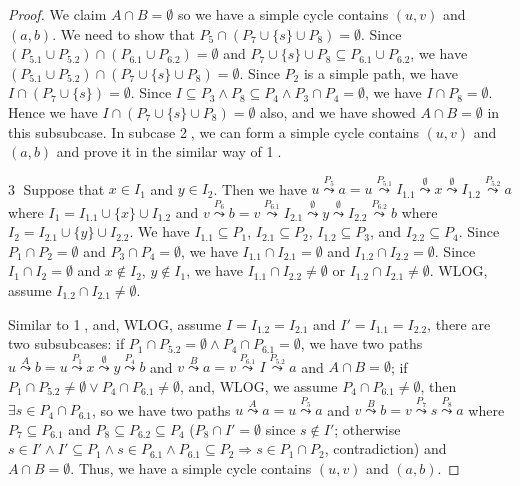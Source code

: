 \begin{proof}
    We claim $A \cap B = \emptyset$ so we have a simple cycle contains $(u,v)$ and $(a,b)$.
    We need to show that $P_5 \cap (P_7 \cup \{ s \} \cup P_8) = \emptyset$.
    Since $(P_{5.1} \cup P_{5.2}) \cap (P_{6.1} \cup P_{6.2}) = \emptyset$
    and $P_7 \cup \{ s \} \cup P_8 \subseteq P_{6.1} \cup P_{6.2}$,
    we have $(P_{5.1} \cup P_{5.2}) \cap (P_7 \cup \{ s \} \cup P_8) = \emptyset$.
    Since $P_2$ is a simple path,
    we have $I \cap (P_7 \cup \{ s \}) = \emptyset$.
    Since $I \subseteq P_3 \wedge P_8 \subseteq P_4 \wedge P_3 \cap P_4 = \emptyset$,
    we have $I \cap P_8 = \emptyset$.
    Hence we have $I \cap (P_7 \cup \{ s \} \cup P_8) = \emptyset$ also,
    and we have showed $A \cap B = \emptyset$ in this subsubcase.
    In subcase \textcircled{2}, we can form a simple cycle contains $(u,v)$ and $(a,b)$
    and prove it in the similar way of \textcircled{1}.

    \textcircled{3} Suppose that $x \in I_1$ and $y \in I_2$.
    Then we have 
    $u \overset{P_5}{\leadsto} a = u \overset{P_{5.1}}{\leadsto} I_{1.1} 
    \overset{\emptyset}{\leadsto} x \overset{\emptyset}{\leadsto}
    I_{1.2} \overset{P_{5.2}}{\leadsto} a$ where $I_1 = I_{1.1} \cup \{ x \} \cup I_{1.2}$
    and
    $v \overset{P_6}{\leadsto} b = v \overset{P_{6.1}}{\leadsto} I_{2.1} 
    \overset{\emptyset}{\leadsto} y \overset{\emptyset}{\leadsto}
    I_{2.2} \overset{P_{6.2}}{\leadsto} b$ where $I_2 = I_{2.1} \cup \{ y \} \cup I_{2.2}$.
    We have $I_{1.1} \subseteq P_1$, $I_{2.1} \subseteq P_2$, 
    $I_{1.2} \subseteq P_3$, and $I_{2.2} \subseteq P_4$.
    Since $P_1 \cap P_2 = \emptyset$ and $P_3 \cap P_4 = \emptyset$,
    we have $I_{1.1} \cap I_{2.1} = \emptyset$ and $I_{1.2} \cap I_{2.2} = \emptyset$.
    Since $I_1 \cap I_2 = \emptyset$ and $x \notin I_2$, $y \notin I_1$,
    we have $I_{1.1} \cap I_{2.2} \neq \emptyset$ or $I_{1.2} \cap I_{2.1} \neq \emptyset$.
    WLOG, assume $I_{1.2} \cap I_{2.1} \neq \emptyset$.
    
    Similar to \textcircled{1},
    and, WLOG, assume $I = I_{1.2} = I_{2.1}$ and $I' = I_{1.1} = I_{2.2}$,
    there are two subsubcases: 
    if $P_1 \cap P_{5.2} = \emptyset \wedge P_4 \cap P_{6.1} = \emptyset$,
    we have two paths $u \overset{A}{\leadsto} b = u \overset{P_1}{\leadsto} x 
    \overset{\emptyset}{\leadsto} y \overset{P_4}{\leadsto} b$ and 
    $v \overset{B}{\leadsto} a = 
    v \overset{P_{6.1}}{\leadsto} I \overset{P_{5.2}}{\leadsto} a$
    and $A \cap B = \emptyset$;
    if $P_1 \cap P_{5.2} \neq \emptyset \vee P_4 \cap P_{6.1} \neq \emptyset$,
    and, WLOG, we assume $P_4 \cap P_{6.1} \neq \emptyset$,
    then $\exists s \in P_4 \cap P_{6.1}$,
    so we have two paths 
    $u \overset{A}{\leadsto} a = u \overset{P_5}{\leadsto} a$
    and $v \overset{B}{\leadsto} b = 
    v \overset{P_7}{\leadsto} s \overset{P_8}{\leadsto} a$
    where $P_7 \subseteq P_{6.1}$ and $P_8 \subseteq P_{6.2} \subseteq P_4$
    ($P_8 \cap I' = \emptyset$ since $s \notin I'$; 
    otherwise $s \in I' \wedge I' \subseteq P_1 \wedge s \in P_{6.1} \wedge P_{6.1} \subseteq P_2
    \Longrightarrow s \in P_1 \cap P_2$, contradiction)
    and $A \cap B = \emptyset$.
    Thus, we have a simple cycle contains $(u,v)$ and $(a,b)$.


\end{proof}
